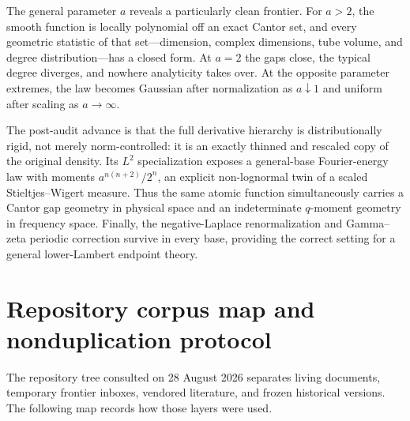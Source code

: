 \documentclass[11pt,oneside]{article}
\theoremstyle{definition}
\theoremstyle{remark}
\begin{document}
The general parameter $a$ reveals a particularly clean frontier.  For $a>2$, the smooth
function is locally polynomial off an exact Cantor set, and every geometric statistic of
that set---dimension, complex dimensions, tube volume, and degree distribution---has a closed
form.  At $a=2$ the gaps close, the typical degree diverges, and nowhere analyticity takes
over.  At the opposite parameter extremes, the law becomes Gaussian after normalization as
$a\downarrow1$ and uniform after scaling as $a\to\infty$.

The post-audit advance is that the full derivative hierarchy is distributionally rigid, not
merely norm-controlled: it is an exactly thinned and rescaled copy of the original density.
Its $L^2$ specialization exposes a general-base Fourier-energy law with moments
$a^{n(n+2)}/2^n$, an explicit non-lognormal twin of a scaled Stieltjes--Wigert measure.  Thus the
same atomic function simultaneously carries a Cantor gap geometry in physical space and an
indeterminate $q$-moment geometry in frequency space.  Finally, the negative-Laplace
renormalization and Gamma--zeta periodic correction survive in every base, providing the
correct setting for a general lower-Lambert endpoint theory.

\appendix

\section{Repository corpus map and nonduplication protocol}
\label{app:repo-audit}

The repository tree consulted on 28 August 2026 separates living documents, temporary frontier
inboxes, vendored literature, and frozen historical versions.  The following map records how
those layers were used.
\end{document}
